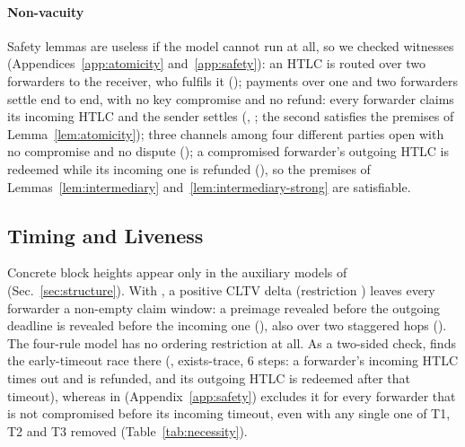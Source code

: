 \label{par:nonvacuity}%
\paragraph{Non-vacuity}
Safety lemmas are useless if the model cannot run at all, so we checked 
witnesses (Appendices~\ref{app:atomicity} and~\ref{app:safety}): an HTLC is routed over two
forwarders to the receiver, who fulfils it (); payments over
one and two forwarders settle end to end, with no key compromise and no refund: every
forwarder claims its incoming HTLC and the sender settles (, ; the second
satisfies the premises of Lemma~\ref{lem:atomicity}); three channels among four different
parties open with no compromise and no dispute (); a
compromised forwarder's outgoing HTLC is redeemed while its incoming one is refunded
(), so the
premises of Lemmas~\ref{lem:intermediary} and~\ref{lem:intermediary-strong} are satisfiable.

\subsection{Timing and Liveness}\label{sec:timing}

Concrete block heights appear only in the auxiliary models of 
(Sec.~\ref{sec:structure}). With , a positive CLTV delta (restriction
) leaves every forwarder a non-empty claim window: a preimage revealed
before the outgoing deadline is revealed before the incoming one (),
also over two staggered hops (). The four-rule model
 has no ordering restriction at all. As a two-sided check, \tamarin{} finds the
early-timeout race there (, exists-trace, 6 steps: a forwarder's incoming HTLC times out and is
refunded, and its outgoing HTLC is redeemed after that timeout), whereas in
  (Appendix~\ref{app:safety}) excludes it for
every forwarder that is not compromised before its incoming timeout, even with any single one of
T1, T2 and T3 removed (Table~\ref{tab:necessity}).

